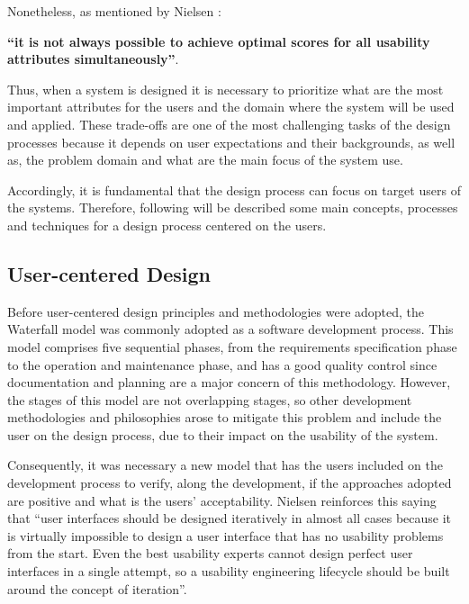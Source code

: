 Nonetheless, as mentioned by Nielsen \cite{usabilityEngineering}: 

\begin{center}
	\textbf{“it is not always possible to achieve optimal scores for all usability attributes simultaneously”}.
\end{center} 

Thus, when a system is designed it is necessary to prioritize what are the most important attributes for the users and the domain where the system will be used and applied. These trade-offs are one of the most challenging tasks of the design processes because it depends on user expectations and their backgrounds, as well as, the problem domain and what are the main focus of the system use.

Accordingly, it is fundamental that the design process can focus on target users of the systems. Therefore, following will be described some main concepts, processes and techniques for a design process centered on the users.

\subsection{User-centered Design}
\label{subsec:user_centered_design}
Before user-centered design principles and methodologies were adopted, the Waterfall model was commonly adopted as a software development process. This model comprises five sequential phases, from the requirements specification phase to the operation and maintenance phase, and has a good quality control since documentation and planning are a major concern of this methodology.\cite{aComparisonBetweenThreeSDLCModelsWatterfallSpiralIncrementalIterative} However, the stages of this model are not overlapping stages, so other development methodologies and philosophies arose to mitigate this problem and include the user on the design process, due to their impact on the usability of the system.

Consequently, it was necessary a new model that has the users included on the development process to verify, along the development, if the approaches adopted are positive and what is the users' acceptability. Nielsen \cite{iterativeUserInterfaceDesign} reinforces this saying that “user interfaces should be designed iteratively in almost all cases because it is virtually impossible to design a user interface that has no usability problems from the start. Even the best usability experts cannot design perfect user interfaces in a single attempt, so a usability engineering lifecycle should be built around the concept of iteration”.

